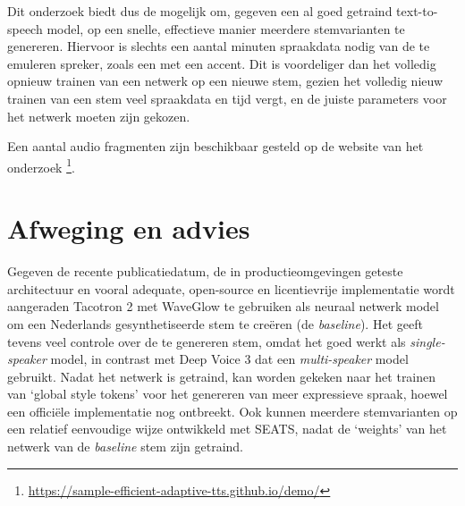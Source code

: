 Dit onderzoek biedt dus de mogelijk om, gegeven een al goed getraind text-to-speech model, op een snelle, effectieve manier meerdere stemvarianten te genereren. Hiervoor is slechts een aantal minuten spraakdata nodig van de te emuleren spreker, zoals een met een accent. Dit is voordeliger dan het volledig opnieuw trainen van een netwerk op een nieuwe stem, gezien het volledig nieuw trainen van een stem veel spraakdata en tijd vergt, en de juiste parameters voor het netwerk moeten zijn gekozen.

Een aantal audio fragmenten zijn beschikbaar gesteld op de website van het onderzoek 
\footnote{\url{https://sample-efficient-adaptive-tts.github.io/demo/}}.


\section{Afweging en advies}
Gegeven de recente publicatiedatum, de in productieomgevingen geteste architectuur en vooral adequate, open-source en licentievrije implementatie wordt aangeraden Tacotron 2 met WaveGlow te gebruiken als neuraal netwerk model om een Nederlands gesynthetiseerde stem te creëren (de \textit{baseline}). Het geeft tevens veel controle over de te genereren stem, omdat het goed werkt als \textit{single-speaker} model, in contrast met Deep Voice 3 dat een \textit{multi-speaker} model gebruikt. Nadat het netwerk is getraind, kan worden gekeken naar het trainen van `global style tokens' voor het genereren van meer expressieve spraak, hoewel een officiële implementatie nog ontbreekt. Ook kunnen meerdere stemvarianten op een relatief eenvoudige wijze ontwikkeld met SEATS, nadat de `weights' van het netwerk van de \textit{baseline} stem zijn getraind.